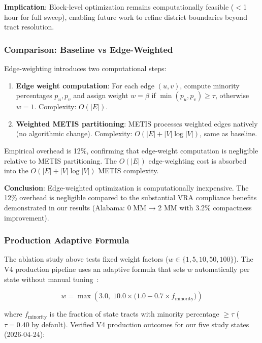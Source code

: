 \textbf{Implication}: Block-level optimization remains computationally feasible ($<$1 hour for full sweep), enabling future work to refine district boundaries beyond tract resolution.

\subsubsection{Comparison: Baseline vs Edge-Weighted}

Edge-weighting introduces two computational steps:
\begin{enumerate}
    \item \textbf{Edge weight computation}: For each edge $(u, v)$, compute minority percentages $p_u, p_v$ and assign weight $w = \beta$ if $\min(p_u, p_v) \geq \tau$, otherwise $w = 1$. Complexity: $O(|E|)$.
    \item \textbf{Weighted METIS partitioning}: METIS processes weighted edges natively (no algorithmic change). Complexity: $O(|E| + |V|\log|V|)$, same as baseline.
\end{enumerate}

Empirical overhead is 12\%, confirming that edge-weight computation is negligible relative to METIS partitioning. The $O(|E|)$ edge-weighting cost is absorbed into the $O(|E| + |V|\log|V|)$ METIS complexity.

\textbf{Conclusion}: Edge-weighted optimization is computationally inexpensive. The 12\% overhead is negligible compared to the substantial VRA compliance benefits demonstrated in our results (Alabama: 0 MM → 2 MM with 3.2\% compactness improvement).

\subsubsection{Production Adaptive Formula}

The ablation study above tests fixed weight factors ($w \in \{1, 5, 10, 50, 100\}$). The V4 production pipeline uses an adaptive formula that sets $w$ automatically per state without manual tuning~\citep{dellaLibera2026D0}:

\begin{equation}
w = \max\!\left(3.0,\; 10.0 \times \bigl(1.0 - 0.7 \times f_{\text{minority}}\bigr)\right)
\label{eq:adaptive_boost_d3}
\end{equation}

where $f_{\text{minority}}$ is the fraction of state tracts with minority percentage $\geq \tau$ ($\tau = 0.40$ by default). Verified V4 production outcomes for our five study states (2026-04-24):

